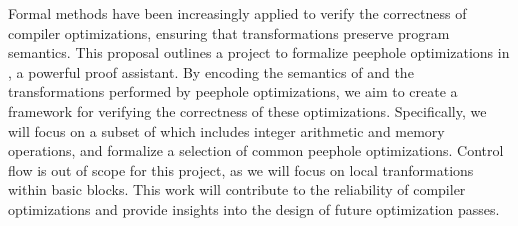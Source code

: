 Formal methods have been increasingly applied to verify the correctness of compiler optimizations,
ensuring that transformations preserve program semantics.
This proposal outlines a project to formalize \llvm peephole optimizations in \lean,
a powerful proof assistant.
By encoding the semantics of \llvm \ir and the transformations performed by peephole optimizations,
we aim to create a framework for verifying the correctness of these optimizations.
Specifically, we will focus on a subset of \llvm \ir which includes integer arithmetic and memory operations, and formalize a selection of common peephole optimizations.
Control flow is out of scope for this project, as we will focus on local tranformations within basic blocks.
This work will contribute to the reliability of compiler optimizations and provide insights into the design of future optimization passes.